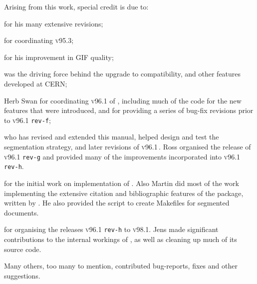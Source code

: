 \bigskip\noindent
Arising from this work, special credit is due to: 
\begin{htmllist}
\item [\Hennecke]  
for his many extensive revisions; 

\item [\Noworolski]  
for coordinating \textsc{v95.3};
 
\item [\Isani]  
for his improvement in GIF quality; 

%
\item [\Goossens]  
was the driving force behind the upgrade to \LaTeXe{} compatibility,
and other features developed at CERN;

\item [Herb Swan] 
for coordinating \textsc{v96.1} of \latextohtml, 
including much of the \Perl{} code 
for the new features that were introduced,
and for providing a series of bug-fix revisions 
prior to  \textsc{v96.1} \texttt{rev-f};

\item [\RossMoore] 
who has revised and extended this manual, helped design and test the 
segmentation strategy, and later revisions of \textsc{v96.1}\,.
Ross organised the release of \textsc{v96.1} \texttt{rev-g} 
and provided many of the improvements
incorporated into \textsc{v96.1} \texttt{rev-h}. 

\item [\Wilck] 
for the initial work on implementation of . 
Also Martin did most of the work implementing the extensive citation and
bibliographic features of the  package, written by \PatrickDaly.
He also provided the  \Perl{} script to create Makefiles
for segmented documents.

\item [\Lippmann] 
for organising the releases \textsc{v96.1} \texttt{rev-h} to \textsc{v98.1}. 
Jens made significant contributions to
the internal workings of \latextohtml, 
as well as cleaning up much of its source code. 
\end{htmllist}

\htmlrule


\bigskip\noindent
Many others, too many to mention, contributed bug-reports, 
fixes and other suggestions.

